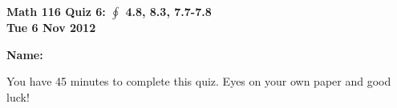 \documentclass[11pt,letterpaper]{article}
\begin{document}
\flushleft
\begin{multicols}{2}

\begin{large}\textbf{Math 116 Quiz 6: $\oint$ 4.8, 8.3, 7.7-7.8 \\
Tue 6 Nov 2012}\end{large}

\textbf{Name:  }\underline{\hspace{4pc}{\bf SOLUTIONS}\hspace{4pc}}

\vspace{.5in}

\end{multicols}

\pagestyle{empty}


\flushleft

You have 45 minutes to complete this quiz.  Eyes on your own paper and good luck!
\end{document}
